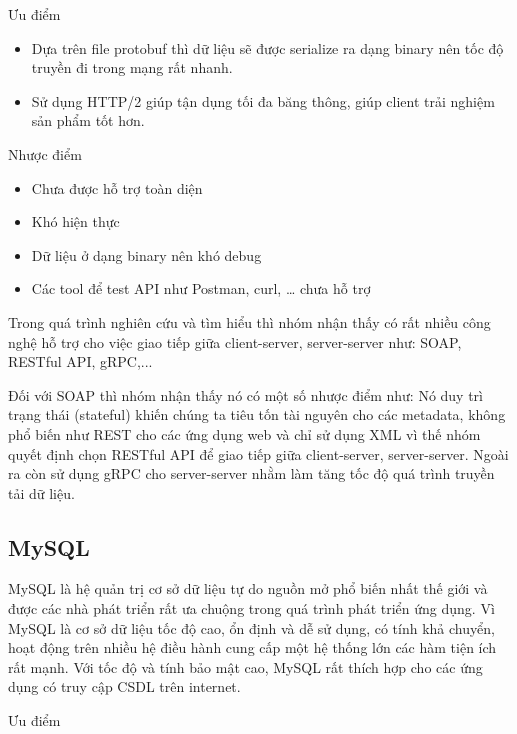 \begin{itemize}
		    Ưu điểm
		    
		    \begin{itemize}
		        \item Dựa trên file protobuf thì dữ liệu sẽ được serialize ra dạng binary nên tốc độ truyền đi trong mạng rất nhanh.
		        \item Sử dụng HTTP/2 giúp tận dụng tối đa băng thông, giúp client trải nghiệm sản phẩm tốt hơn.
		    \end{itemize}
		    
		    Nhược điểm
		    
		    \begin{itemize}
		        \item Chưa được hỗ trợ toàn diện
		        \item Khó hiện thực
		        \item Dữ liệu ở dạng binary nên khó debug
		        \item Các tool để test API như Postman, curl, … chưa hỗ trợ
		    \end{itemize}
		    
		    Trong quá trình nghiên cứu và tìm hiểu thì nhóm nhận thấy có rất nhiều công nghệ hỗ trợ cho việc giao tiếp giữa client-server, server-server như: SOAP, RESTful API, gRPC,...

            Đối với SOAP thì nhóm nhận thấy nó có một số nhược điểm như: Nó duy trì trạng thái (stateful) khiến chúng ta tiêu tốn tài nguyên cho các metadata, không phổ biến như REST cho các ứng dụng web và chỉ sử dụng XML vì thế nhóm quyết định chọn RESTful API để giao tiếp giữa client-server, server-server. Ngoài ra còn sử dụng gRPC cho server-server nhằm làm tăng tốc độ quá trình truyền tải dữ liệu.
            \subsection{MySQL}
            
            MySQL là hệ quản trị cơ sở dữ liệu tự do nguồn mở phổ biến nhất thế giới và được các nhà phát triển rất ưa chuộng trong quá trình phát triển ứng dụng. Vì MySQL là cơ sở dữ liệu tốc độ cao, ổn định và dễ sử dụng, có tính khả chuyển, hoạt động trên nhiều hệ điều hành cung cấp một hệ thống lớn các hàm tiện ích rất mạnh. Với tốc độ và tính bảo mật cao, MySQL rất thích hợp cho các ứng dụng có truy cập CSDL trên internet.
            
            Ưu điểm
            

\end{itemize}
